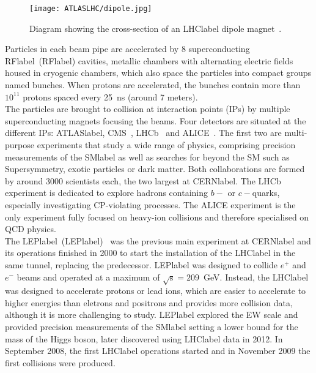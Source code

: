 \begin{figure}[htbp]
    \RawFloats
    \begin{center}
    \texttt{[image: ATLASLHC/dipole.jpg]}
    \caption{
        Diagram showing the cross-section of an \acrshort{LHClabel} dipole magnet~\cite{LHCdipole}. 
    }
    \label{figLHC:dipole}
    \end{center}
\end{figure}

Particles in each beam pipe are accelerated by 8 superconducting \acrlong{RFlabel}~(\acrshort{RFlabel}) cavities, metallic chambers with alternating electric fields housed in cryogenic chambers, which also space the particles into compact groups named bunches. When protons are accelerated, the bunches contain more than $10^{11}$ protons spaced every 25~ns (around 7 meters).\\

The particles are brought to collision at interaction points (IPs) by multiple superconducting magnets focusing the beams. Four detectors are situated at the different IPs: \acrshort{ATLASlabel}, CMS~\cite{CMSmachine}, LHCb~\cite{LHCbmachine} and ALICE~\cite{ALICEmachine}. The first two are multi-purpose experiments that study a wide range of physics, comprising precision measurements of the \acrshort{SMlabel} as well as searches for beyond the SM such as Supersymmetry, exotic particles or dark matter. Both collaborations are formed by around 3000 scientists each, the two largest at \acrshort{CERNlabel}. The LHCb experiment is dedicated to explore hadrons containing $b-$ or $c-$quarks, especially investigating CP-violating processes. The ALICE experiment is the only experiment fully focused on heavy-ion collisions and therefore specialised on QCD physics.\\

The \acrlong{LEPlabel}~(\acrshort{LEPlabel})~\cite{LEPmachine} was the previous main experiment at \acrshort{CERNlabel} and its operations finished in 2000 to start the installation of the \acrshort{LHClabel} in the same tunnel, replacing the predecessor. \acrshort{LEPlabel} was designed to collide $e^+$ and $e^-$ beams and operated at a maximum of $\sqrt{\text{s}}=209$~GeV. Instead, the \acrshort{LHClabel} was designed to accelerate protons or lead ions, which are easier to accelerate to higher energies than eletrons and positrons and provides more collision data, although it is more challenging to study. \acrshort{LEPlabel} explored the \acrshort{EW} scale and provided precision measurements of the \acrshort{SMlabel} setting a lower bound for the mass of the Higgs boson, later discovered using \acrshort{LHClabel} data in 2012. In September 2008, the first \acrshort{LHClabel} operations started and in November 2009 the first collisions were produced. 

